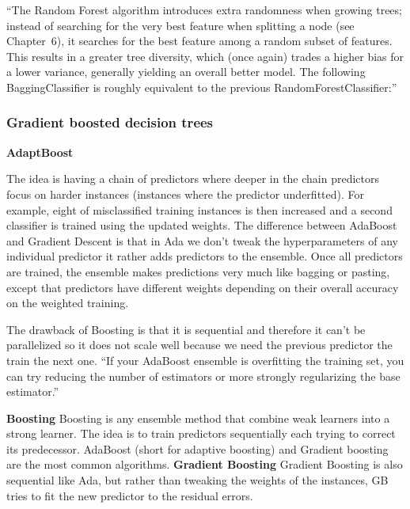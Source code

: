 \documentclass[11pt]{article}
\begin{document}
“The Random Forest algorithm introduces extra randomness when growing trees; instead of searching for the very best feature when splitting a node (see Chapter 6), it searches for the best feature among a random subset of features. This results in a greater tree diversity, which (once again) trades a higher bias for a lower variance, generally yielding an overall better model. The following BaggingClassifier is roughly equivalent to the previous RandomForestClassifier:”


\subsubsection{Gradient boosted decision trees}
\textbf{AdaptBoost}

The idea is having a chain of predictors where deeper in the chain predictors focus on harder instances (instances where the predictor underfitted). For example, eight of misclassified training instances is then increased and a second classifier is trained using the updated weights. The difference between AdaBoost and Gradient Descent is that in Ada we don't tweak the hyperparameters of any individual predictor it rather adds predictors to the ensemble. Once all predictors are trained, the ensemble makes predictions very much like bagging or pasting, except that predictors have different weights depending on their overall accuracy on the weighted training.

The drawback of Boosting is that it is sequential and therefore it can't be parallelized so it does not scale well because we need the previous predictor the train the next one.
“If your AdaBoost ensemble is overfitting the training set, you can try reducing the number of estimators or more strongly regularizing the base estimator.”

\textbf{Boosting}
Boosting is any ensemble method that combine weak learners into a strong learner. The idea is to train predictors sequentially each trying to correct its predecessor. AdaBoost (short for adaptive boosting) and Gradient boosting are the most common algorithms.
\textbf{Gradient Boosting}
Gradient Boosting is also sequential like Ada, but rather than tweaking the weights of the instances, GB tries to fit the new predictor to the residual errors.
\end{document}
